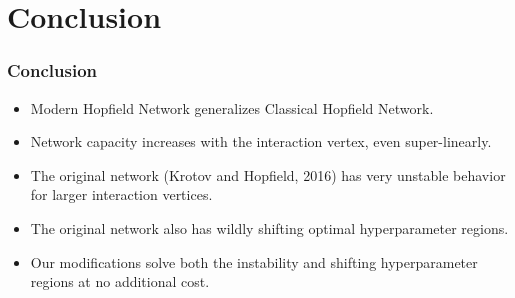 

\section{Conclusion}

\begin{frame}
\frametitle{Conclusion}
\begin{itemize}
    \item Modern Hopfield Network generalizes Classical Hopfield Network.
    \item Network capacity increases with the interaction vertex, even super-linearly.
    \item The original network (Krotov and Hopfield, 2016) has very unstable behavior for larger interaction vertices.
    \item The original network also has wildly shifting optimal hyperparameter regions.
    \item Our modifications solve both the instability and shifting hyperparameter regions at no additional cost.
\end{itemize}
\end{frame}

